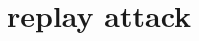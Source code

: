 \documentclass[conference]{IEEEtran}
\begin{document}
\section{replay attack} %


%
%
\end{document}
